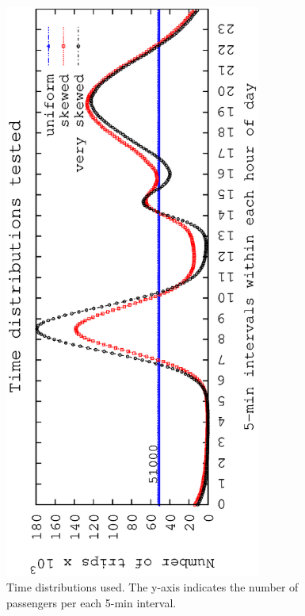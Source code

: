 \begin{figure}[tbp]
	\begin{center}
		\includegraphics[angle=-90,width=0.75\textwidth]{figures_synt/timedistrib.eps}		
		\caption{Time distributions used. The y-axis indicates the number of passengers per each 5-min interval.}
		\label{fig:distrib}
	\end{center}
	\vspace{-3mm}
\end{figure}

